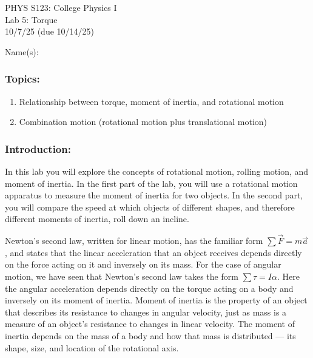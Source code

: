 \documentclass[11pt,letterpaper]{article}
\begin{document}
\setlength{\parindent}{0in}


\begin{flushright}
PHYS S123: College Physics I\\
Lab 5: Torque\\
10/7/25 (due 10/14/25)
\end{flushright}

Name(s):\\

\subsubsection*{Topics:}
\begin{enumerate}
\setlength{\parskip}{3pt}
\item Relationship between torque, moment of inertia, and rotational motion
\item Combination motion (rotational motion plus translational motion)
\end{enumerate}

\subsubsection*{Introduction:}
In this lab you will explore the concepts of rotational motion, rolling motion, and moment of inertia. In the first part of the lab, you will use a rotational motion apparatus to measure the moment of inertia for two objects. In the second part, you will compare the speed at which objects of different shapes, and therefore different moments of inertia, roll down an incline.  
 
Newton's second law, written for linear motion, has the familiar form $\sum \vec{F}=m\vec{a}$, and states that the linear acceleration that an object receives depends directly on the force acting on it
and inversely on its mass.  For the case of angular motion, we have seen that Newton's
second law takes the form $\sum\tau = I \alpha$. Here the angular acceleration depends directly on the torque acting on a body and inversely on its moment of inertia.  Moment of inertia is the
property of an object that describes its resistance to changes in angular velocity, just as mass is a measure of an object's resistance to changes in linear velocity. The moment of inertia depends on the mass of a body and how that mass is distributed --- its shape, size, and location of the rotational axis.
\end{document}
